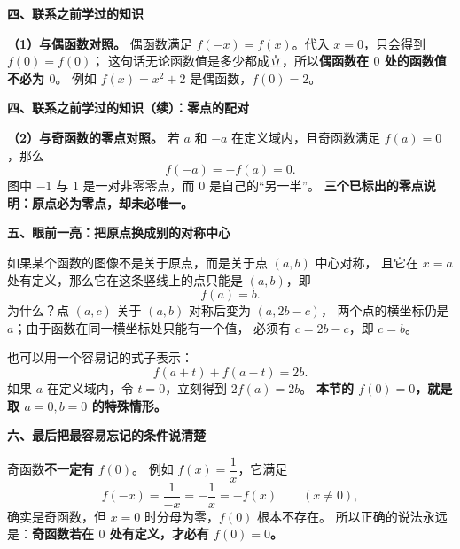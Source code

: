\clearpage
\begin{explanationbox}
\textbf{\textcolor{CExplanation}{四、联系之前学过的知识}}



  \textbf{（1）与偶函数对照。}
  偶函数满足 $f(-x)=f(x)$。代入 $x=0$，只会得到 $f(0)=f(0)$；
  这句话无论函数值是多少都成立，所以\textbf{偶函数在 $0$ 处的函数值不必为 $0$}。
  例如 $f(x)=x^2+2$ 是偶函数，$f(0)=2$。

  
\end{explanationbox}
\clearpage
\begin{explanationbox}
\textbf{\textcolor{CExplanation}{四、联系之前学过的知识（续）：零点的配对}}


\textbf{（2）与奇函数的零点对照。}
  若 $a$ 和 $-a$ 在定义域内，且奇函数满足 $f(a)=0$，那么
  \[
    f(-a)=-f(a)=0.
  \]
  图中 $-1$ 与 $1$ 是一对非零零点，而 $0$ 是自己的“另一半”。
  \textbf{三个已标出的零点说明：原点必为零点，却未必唯一。}

  \medskip
  
\end{explanationbox}
\clearpage
\begin{explanationbox}
\textbf{\textcolor{CExplanation}{五、眼前一亮：把原点换成别的对称中心}}



  如果某个函数的图像不是关于原点，而是关于点 $(a,b)$ 中心对称，
  且它在 $x=a$ 处有定义，那么它在这条竖线上的点只能是 $(a,b)$，即
  \[
    \boxed{f(a)=b.}
  \]
  为什么？点 $(a,c)$ 关于 $(a,b)$ 对称后变为 $(a,2b-c)$，
  两个点的横坐标仍是 $a$；由于函数在同一横坐标处只能有一个值，
  必须有 $c=2b-c$，即 $c=b$。

  也可以用一个容易记的式子表示：
  \[
    f(a+t)+f(a-t)=2b.
  \]
  如果 $a$ 在定义域内，令 $t=0$，立刻得到 $2f(a)=2b$。
  \textbf{本节的 $f(0)=0$，就是取 $a=0,b=0$ 的特殊情形。}

  \medskip
  
\end{explanationbox}
\clearpage
\begin{explanationbox}
\textbf{\textcolor{CExplanation}{六、最后把最容易忘记的条件说清楚}}



  奇函数\textbf{不一定有} $f(0)$。
  例如 $f(x)=\dfrac1x$，它满足
  \[
    f(-x)=\frac1{-x}=-\frac1x=-f(x)\qquad(x\ne0),
  \]
  确实是奇函数，但 $x=0$ 时分母为零，$f(0)$ 根本不存在。
  所以正确的说法永远是：\textbf{奇函数若在 $0$ 处有定义，才必有 $f(0)=0$。}
\end{explanationbox}
